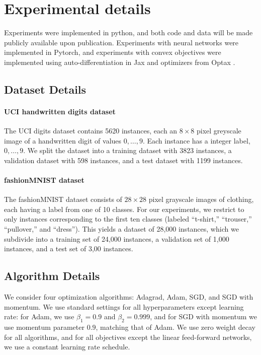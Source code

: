 \section{Experimental details}\label{sec:experimental-details}

Experiments were implemented in python, and both code and data will be made publicly available upon publication. Experiments with neural networks were implemented in Pytorch, and experiments with convex objectives were implemented using auto-differentiation in Jax and optimizers from Optax \cite{paszke2017automatic, jax2018github, deepmind2020jax}.

\subsection{Dataset Details}\label{ssec:dataset-details}

\paragraph{UCI handwritten digits dataset} The UCI digits dataset \cite{optical_recognition_of_handwritten_digits_80} contains 5620 instances, each an $8\times 8$ pixel greyscale image of a handwritten digit of values $0,\dots, 9$. Each instance has a integer label, $0,\dots, 9$. We split the dataset into a training dataset with 3823 instances, a validation dataset with 598 instances, and a test dataset with 1199 instances.

\paragraph{fashionMNIST dataset} The fashionMNIST dataset consists of $28\times 28$ pixel grayscale images of clothing, each having a label from one of 10 classes. For our experiments, we restrict to only instances corresponding to the first ten classes (labeled ``t-shirt,'' ``trouser,'' ``pullover,'' and ``dress''). This yields a dataset of 28,000 instances, which we subdivide into a training set of 24,000 instances, a validation set of 1,000 instances, and a test set of 3,00 instances.

\subsection{Algorithm Details}\label{ssec:algorithm-details}

We consider four optimization algorithms: Adagrad, Adam, SGD, and SGD with momentum. We use standard settings for all hyperparameters except learning rate: for Adam, we use $\beta_1 = 0.9$ and $\beta_2 = 0.999$, and for SGD with momentum we use momentum parameter $0.9$, matching that of Adam. We use zero weight decay for all algorithms, and for all objectives except the linear feed-forward networks, we use a constant learning rate schedule.

